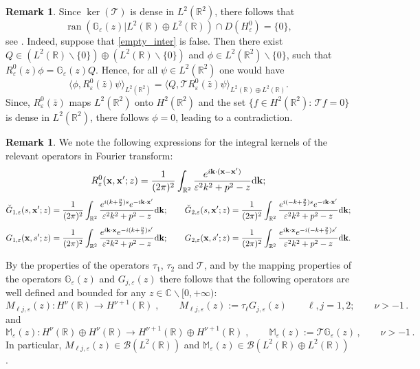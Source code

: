 \documentclass[a4paper,11pt,reqno]{amsart}
\theoremstyle{definition}
\newtheorem{remark}[theorem]{Remark}
\numberwithin{equation}{section}
\newcommand{\ran}{\operatorname{ran }}
\newcommand{\CO}{\mathbb C}
\newcommand{\RE}{\mathbb R}
\newcommand{\Gb}{\mathbb G}
\newcommand{\Mb}{\mathbb M}
\newcommand{\Tau}{\mathcal{T}}
\newcommand{\Bou}{\mathscr{B}}
\newcommand{\ve}{\varepsilon}
\newcommand{\x}{{\bf  x}}
\renewcommand{\k}{{\bf k}}
\newcommand{\dk}{\mathrm{d}{\bf k}}
\begin{document}
\begin{remark}\label{r:GcapDH}Since $\ker (\Tau)$ is dense in $L^2(\RE^2)$, there follows that 
\begin{equation}\label{empty_inter}
\ran(\Gb_\ve(z)|L^{2}(\RE) \oplus  L^{2}(\RE) ) \cap D(H^{0}_{\ve}) = \{0\},
\end{equation}
see \cite[Rem. 2.8, 2.9 and Theorem 2.1]{Pjfa01}. Indeed, suppose that \eqref{empty_inter} is false. Then there exist $Q \in (L^{2}(\RE)\backslash\{0\}) \oplus  (L^{2}(\RE)\backslash\{0\}) $ and $\phi\in L^2(\RE^2)\backslash\{0\}$,  such that $R^{0}_{\ve}(z)  \phi = \Gb_\ve(z) Q$. Hence, for all  $\psi\in L^2(\RE^2)$ one would have 
\[
\langle\phi, R^{0}_{\ve}(\bar z)  \psi \rangle_{L^2(\RE^2)} = \langle Q, \Tau R^{0}_{\ve}(\bar z) \psi \rangle_{ L^{2}(\RE) \oplus  L^{2}(\RE) }. 
\]
Since, $R^{0}_{\ve}(\bar z)$ maps $L^2(\RE^2)$  onto $H^2(\RE^2)$ and the set $\{f\in H^2(\RE^2): \, \Tau f = 0\}$ is dense in $L^2(\RE^2)$, there follows $\phi =0$, leading to a contradiction. 
\end{remark}

\begin{remark}\label{r:op-in-fou-transf}We note the following expressions for  the integral kernels of the relevant operators in Fourier transform:
\[
R^{0}_{\ve}(\x,\x';z)  =\frac{1}{(2\pi)^2}  \int_{\RE^2} \frac{ e^{i\k\cdot (\x -\x') }}{\ve^2 k^2 +p^2  - z}   \dk ;
\]
\[
\breve G_{1,\ve}( s,\x'; z)  =   \frac{1}{(2\pi)^2}  \int_{\RE^2} \frac{ e^{i (k + \frac{p}2) s} e^{- i\k\cdot \x' }}{\ve^2 k^2 +p^2  - z}   \dk ;
\qquad 
\breve G_{2,\ve}( s,\x'; z)  =   \frac{1}{(2\pi)^2}  \int_{\RE^2} \frac{ e^{i (-k + \frac{p}2) s} e^{- i\k \cdot \x' }}{\ve^2 k^2 +p^2  - z}   \dk ;
\]
\[
G_{1,\ve}( \x, s'; z)  =   \frac{1}{(2\pi)^2}  \int_{\RE^2} \frac{e^{i\k \cdot \x }  e^{-i (k + \frac{p}2) s'} }{\ve^2 k^2 +p^2  - z}   \dk ; 
\qquad 
G_{2, \ve}( \x, s'; z)  =   \frac{1}{(2\pi)^2}  \int_{\RE^2} \frac{e^{i\k \cdot \x }  e^{-i (-k + \frac{p}2) s'} }{\ve^2 k^2 +p^2  - z}   \dk . 
\]
\end{remark}

By the properties of the operators $\tau_1$, $\tau_2$ and $\Tau$, and by the mapping properties of the operators $\Gb_{\ve}(z)$ and $G_{j,\ve}(z)$ there follows that the following operators are well defined and bounded for any $z\in\CO\backslash [0,+\infty)$: 
\[
M_{\ell j,\ve}(z) :  H^{\nu}(\RE) \to  H^{\nu+1}(\RE)\;,\qquad  M_{\ell j,\ve}(z)  :=  \tau_{\ell} G_{j,\ve}(z) \qquad \ell,j = 1,2;\qquad \nu>-1\, .
\]
and 
\[
\Mb_{\ve}(z) :  H^{\nu}(\RE)\oplus H^{\nu}(\RE) \to  H^{\nu+1}(\RE)\oplus H^{\nu+1}(\RE)\;,\qquad  \Mb_{\ve}(z)  := \Tau \Gb_{\ve}(z)\,,\qquad \nu>-1\, .
\]
In particular, $M_{\ell j,\ve}(z) \in \Bou(L^2(\RE))$  and $\Mb_{\ve}(z) \in \Bou(L^2(\RE)\oplus L^2(\RE))$. 
\end{document}
